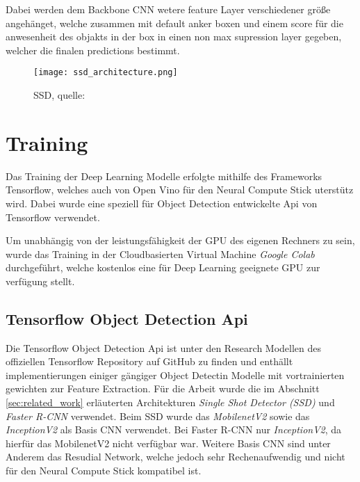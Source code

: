 Dabei werden dem Backbone CNN wetere feature Layer verschiedener größe 
angehänget, welche zusammen mit default anker boxen und einem score 
für die anwesenheit des objakts in der box in einen non max supression 
layer gegeben, welcher die finalen predictions bestimmt.


\begin{figure}[H]
    \centering
    \label{fig:faster_rcnn}
    \texttt{[image: ssd\_architecture.png]}
    \caption{SSD, quelle: \cite{SSDSingleShot}}
\end{figure}




\section{Training}

Das Training der Deep Learning Modelle erfolgte mithilfe 
des Frameworks Tensorflow, welches auch von 
Open Vino für den Neural Compute Stick uterstütz wird.
Dabei wurde eine speziell für Object Detection 
entwickelte Api von Tensorflow verwendet.

Um unabhängig von der leistungsfähigkeit der GPU des eigenen 
Rechners zu sein, wurde das Training in der Cloudbasierten Virtual 
Machine \textit{Google Colab} \cite{colab} durchgeführt, welche kostenlos eine für 
Deep Learning geeignete GPU zur verfügung stellt.



\subsection{Tensorflow Object Detection Api}



Die Tensorflow Object Detection Api ist unter den Research Modellen
\cite{tfobjdet} des offiziellen Tensorflow Repository auf GitHub zu
finden und enthällt implementierungen einiger gängiger Object Detectin
Modelle mit vortrainierten gewichten zur Feature Extraction.
Für die Arbeit wurde die im Abschnitt \ref{sec:related_work} 
erläuterten Architekturen \textit{Single Shot Detector (SSD)}
und \textit{Faster R-CNN} verwendet.
Beim SSD wurde das \textit{MobilenetV2} sowie das \textit{InceptionV2} 
als Basis CNN verwendet.
Bei Faster R-CNN nur \textit{InceptionV2}, da hierfür das MobilenetV2 
nicht verfügbar war.
Weitere Basis CNN sind unter Anderem das Resudial Network, welche jedoch 
sehr Rechenaufwendig und nicht für den Neural Compute Stick 
kompatibel ist.

